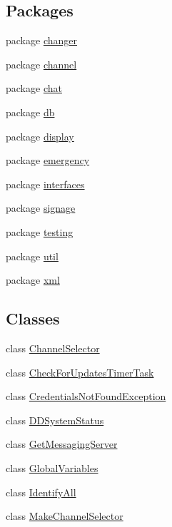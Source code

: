 \subsection*{Packages}
\begin{DoxyCompactItemize}
\item 
package \hyperlink{namespacegov_1_1fnal_1_1ppd_1_1dd_1_1changer}{changer}
\item 
package \hyperlink{namespacegov_1_1fnal_1_1ppd_1_1dd_1_1channel}{channel}
\item 
package \hyperlink{namespacegov_1_1fnal_1_1ppd_1_1dd_1_1chat}{chat}
\item 
package \hyperlink{namespacegov_1_1fnal_1_1ppd_1_1dd_1_1db}{db}
\item 
package \hyperlink{namespacegov_1_1fnal_1_1ppd_1_1dd_1_1display}{display}
\item 
package \hyperlink{namespacegov_1_1fnal_1_1ppd_1_1dd_1_1emergency}{emergency}
\item 
package \hyperlink{namespacegov_1_1fnal_1_1ppd_1_1dd_1_1interfaces}{interfaces}
\item 
package \hyperlink{namespacegov_1_1fnal_1_1ppd_1_1dd_1_1signage}{signage}
\item 
package \hyperlink{namespacegov_1_1fnal_1_1ppd_1_1dd_1_1testing}{testing}
\item 
package \hyperlink{namespacegov_1_1fnal_1_1ppd_1_1dd_1_1util}{util}
\item 
package \hyperlink{namespacegov_1_1fnal_1_1ppd_1_1dd_1_1xml}{xml}
\end{DoxyCompactItemize}
\subsection*{Classes}
\begin{DoxyCompactItemize}
\item 
class \hyperlink{classgov_1_1fnal_1_1ppd_1_1dd_1_1ChannelSelector}{Channel\-Selector}
\item 
class \hyperlink{classgov_1_1fnal_1_1ppd_1_1dd_1_1CheckForUpdatesTimerTask}{Check\-For\-Updates\-Timer\-Task}
\item 
class \hyperlink{classgov_1_1fnal_1_1ppd_1_1dd_1_1CredentialsNotFoundException}{Credentials\-Not\-Found\-Exception}
\item 
class \hyperlink{classgov_1_1fnal_1_1ppd_1_1dd_1_1DDSystemStatus}{D\-D\-System\-Status}
\item 
class \hyperlink{classgov_1_1fnal_1_1ppd_1_1dd_1_1GetMessagingServer}{Get\-Messaging\-Server}
\item 
class \hyperlink{classgov_1_1fnal_1_1ppd_1_1dd_1_1GlobalVariables}{Global\-Variables}
\item 
class \hyperlink{classgov_1_1fnal_1_1ppd_1_1dd_1_1IdentifyAll}{Identify\-All}
\item 
class \hyperlink{classgov_1_1fnal_1_1ppd_1_1dd_1_1MakeChannelSelector}{Make\-Channel\-Selector}
\end{DoxyCompactItemize}
